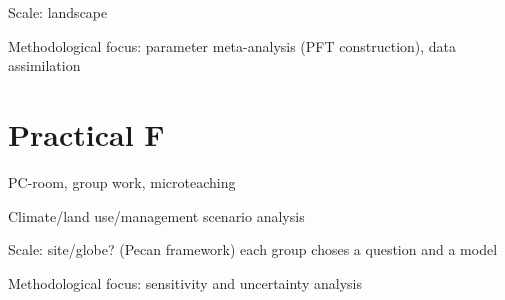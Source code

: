 \documentclass[oneside]{book}
\begin{document}
Scale: landscape

Methodological focus: parameter meta-analysis (PFT construction), data
assimilation

\chapter*{Practical F}\label{practical-f}

PC-room, group work, microteaching

Climate/land use/management scenario analysis

Scale: site/globe? (Pecan framework) each group choses a question and a
model

Methodological focus: sensitivity and uncertainty analysis


\end{document}
